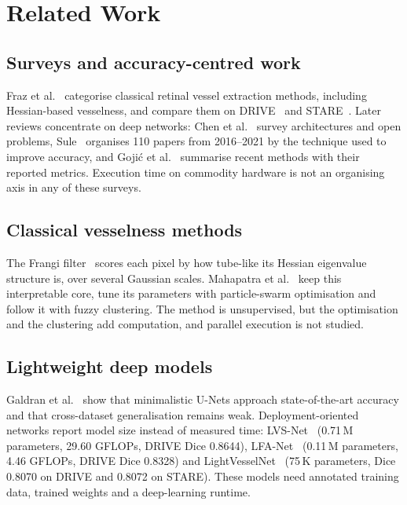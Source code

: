 \section{Related Work}\label{sec:related}

\subsection{Surveys and accuracy-centred work}
Fraz et al.~\cite{fraz2012} categorise classical retinal vessel extraction methods, including Hessian-based
vesselness, and compare them on DRIVE~\cite{staal2004} and STARE~\cite{hoover2000}. Later reviews concentrate
on deep networks: Chen et al.~\cite{chen2021} survey architectures and open problems, Sule~\cite{sule2022}
organises 110 papers from 2016--2021 by the technique used to improve accuracy, and Goji\'c et
al.~\cite{gojic2023} summarise recent methods with their reported metrics. Execution time on commodity hardware
is not an organising axis in any of these surveys.

\subsection{Classical vesselness methods}
The Frangi filter~\cite{frangi1998} scores each pixel by how tube-like its Hessian eigenvalue structure is,
over several Gaussian scales. Mahapatra et al.~\cite{mahapatra2022} keep this interpretable core, tune its
parameters with particle-swarm optimisation and follow it with fuzzy clustering. The method is unsupervised,
but the optimisation and the clustering add computation, and parallel execution is not studied.

\subsection{Lightweight deep models}
Galdran et al.~\cite{galdran2022} show that minimalistic U-Nets approach state-of-the-art accuracy and that
cross-dataset generalisation remains weak. Deployment-oriented networks report model size instead of measured
time: LVS-Net~\cite{mehmood2024lvs} (0.71\,M parameters, 29.60 GFLOPs, DRIVE Dice 0.8644),
LFA-Net~\cite{mehmood2025lfa} (0.11\,M parameters, 4.46 GFLOPs, DRIVE Dice 0.8328) and
LightVesselNet~\cite{sobhan2026} (75\,K parameters, Dice 0.8070 on DRIVE and 0.8072 on STARE). These models
need annotated training data, trained weights and a deep-learning runtime.

